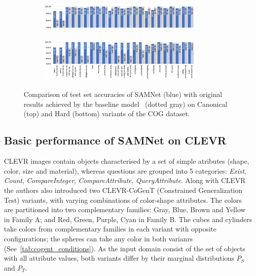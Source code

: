 \begin{figure}[t!]
	\centering
	\begin{subfigure}{\textwidth}
		\centering
		\includegraphics[width=0.9\textwidth]{../img/plots/cog_canonical_baseline_no_labels.pdf}
	\end{subfigure}%
	\newline
	\begin{subfigure}{\textwidth}
		\centering
		\includegraphics[width=0.9\textwidth]{../img/plots/cog_hard_baseline_labels.pdf}
	\end{subfigure}%
	\caption{Comparison of test set accuracies of SAMNet (blue) with original results achieved by the baseline model~\cite{yang2018dataset} (dotted gray) on Canonical (top) and Hard (bottom) variants of the COG dataset.}
	\label{fig:samnet_cog_detailed}
\end{figure}

\subsection{Basic performance of SAMNet on CLEVR}
\label{sec:clevr-baseline-compare}
CLEVR images contain objects characterised by a set of simple atributes (shape, color, size and material), whereas questions are grouped into 5 categories: \textit{Exist}, \textit{Count}, \textit{CompareInteger}, \textit{CompareAttribute}, \textit{QueryAttribute}.
Along with CLEVR the authors also introduced two CLEVR-CoGenT (Constrained Generalization Test) variants, with varying combinations of color-shape attributes.
The colors are partitioned into two complementary families:
Gray, Blue, Brown and Yellow in Family A; and Red, Green, Purple, Cyan in Family B.
The cubes and cylinders take colors from complementary families in each variant with opposite configurations; the spheres can take any color in both varianrs (See~\cref{tab:cogent_conditions}).
As the input domain consist of the set of objects with all attribute values, both variants differ by their marginal distributions $P_S$ and $P_T$.

